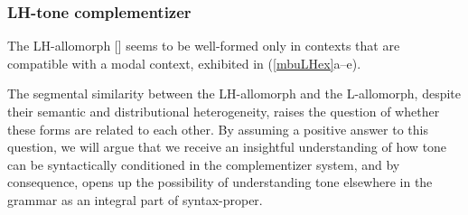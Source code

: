 \documentclass[output=paper,colorlinks,citecolor=brown]{langscibook}
\begin{document}
\subsubsection{LH-tone complementizer} \label{secLH}

The LH-allomorph [\mbuLH] seems to be well-formed only in contexts that are compatible with a modal context, exhibited in (\ref{mbuLHex}a--e).

\ea \label{mbuLHex}
    \begin{xlist}
    \end{xlist}
\z

\begin{sloppypar}
The segmental similarity between the LH-allomorph and the L-allomorph, despite their semantic and distributional heterogeneity, raises the question of wheth\-er these forms are related to each other. By assuming a positive answer to this question, we will argue that we receive an insightful understanding of how tone can be syntactically conditioned in the complementizer system, and by consequence, opens up the possibility of understanding tone elsewhere in the grammar as an integral part of syntax-proper.
\end{sloppypar}
\end{document}
